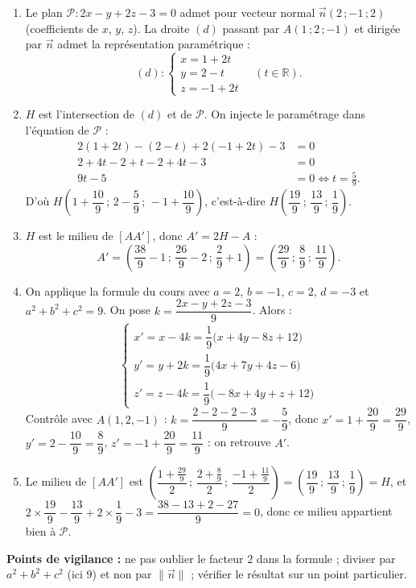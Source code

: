 \documentclass[11pt]{article}
\begin{document}
\begin{corrige}
\begin{enumerate}
\item Le plan $\mathcal{P}:2x-y+2z-3=0$ admet pour vecteur normal $\vec{n}(2\,;-1\,;2)$ (coefficients de $x$, $y$, $z$). La droite $(d)$ passant par $A(1\,;2\,;-1)$ et dirigée par $\vec{n}$ admet la représentation paramétrique :
\[ (d):\begin{cases} x=1+2t \\ y=2-t \\ z=-1+2t \end{cases}\quad (t\in\mathbb{R}). \]
\item $H$ est l'intersection de $(d)$ et de $\mathcal{P}$. On injecte le paramétrage dans l'équation de $\mathcal{P}$ :
\begin{align*}
2(1+2t)-(2-t)+2(-1+2t)-3&=0\\
2+4t-2+t-2+4t-3&=0\\
9t-5&=0 \iff t=\frac{5}{9}.
\end{align*}
D'où $H\left(1+\dfrac{10}{9}\,;\,2-\dfrac{5}{9}\,;\,-1+\dfrac{10}{9}\right)$, c'est-à-dire $H\left(\dfrac{19}{9}\,;\,\dfrac{13}{9}\,;\,\dfrac{1}{9}\right)$.
\item $H$ est le milieu de $[AA']$, donc $A'=2H-A$ :
\[ A'=\left(\frac{38}{9}-1\,;\,\frac{26}{9}-2\,;\,\frac{2}{9}+1\right)=\left(\frac{29}{9}\,;\,\frac{8}{9}\,;\,\frac{11}{9}\right). \]
\item On applique la formule du cours avec $a=2$, $b=-1$, $c=2$, $d=-3$ et $a^2+b^2+c^2=9$. On pose $k=\dfrac{2x-y+2z-3}{9}$. Alors :
\[ \begin{cases}
x'=x-4k=\dfrac{1}{9}\bigl(x+4y-8z+12\bigr)\\[4pt]
y'=y+2k=\dfrac{1}{9}\bigl(4x+7y+4z-6\bigr)\\[4pt]
z'=z-4k=\dfrac{1}{9}\bigl(-8x+4y+z+12\bigr)
\end{cases} \]
Contrôle avec $A(1,2,-1)$ : $k=\dfrac{2-2-2-3}{9}=-\dfrac{5}{9}$, donc $x'=1+\dfrac{20}{9}=\dfrac{29}{9}$, $y'=2-\dfrac{10}{9}=\dfrac{8}{9}$, $z'=-1+\dfrac{20}{9}=\dfrac{11}{9}$ : on retrouve $A'$.
\item Le milieu de $[AA']$ est $\left(\dfrac{1+\frac{29}{9}}{2}\,;\,\dfrac{2+\frac{8}{9}}{2}\,;\,\dfrac{-1+\frac{11}{9}}{2}\right)=\left(\dfrac{19}{9}\,;\,\dfrac{13}{9}\,;\,\dfrac{1}{9}\right)=H$, et $2\times\dfrac{19}{9}-\dfrac{13}{9}+2\times\dfrac{1}{9}-3=\dfrac{38-13+2-27}{9}=0$, donc ce milieu appartient bien à $\mathcal{P}$.
\end{enumerate}
\textbf{Points de vigilance :} ne pas oublier le facteur $2$ dans la formule ; diviser par $a^2+b^2+c^2$ (ici $9$) et non par $\|\vec{n}\|$ ; vérifier le résultat sur un point particulier.
\end{corrige}
\end{document}
